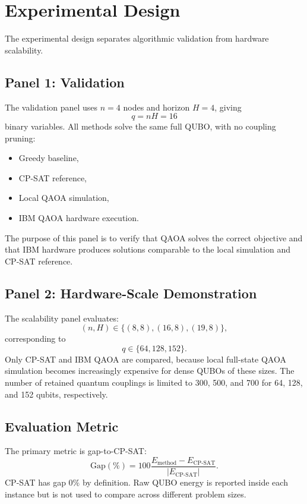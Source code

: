 \documentclass[runningheads]{llncs}
\begin{document}
\section{Experimental Design}

The experimental design separates algorithmic validation from hardware scalability.

\subsection{Panel 1: Validation}

The validation panel uses $n=4$ nodes and horizon $H=4$, giving
\begin{equation}
q=nH=16
\end{equation}
binary variables. All methods solve the same full QUBO, with no coupling pruning:
\begin{itemize}
    \item Greedy baseline,
    \item CP-SAT reference,
    \item Local QAOA simulation,
    \item IBM QAOA hardware execution.
\end{itemize}
The purpose of this panel is to verify that QAOA solves the correct objective and that IBM hardware produces solutions comparable to the local simulation and CP-SAT reference.

\subsection{Panel 2: Hardware-Scale Demonstration}

The scalability panel evaluates:
\begin{equation}
(n,H)\in\{(8,8),(16,8),(19,8)\},
\end{equation}
corresponding to
\begin{equation}
q\in\{64,128,152\}.
\end{equation}
Only CP-SAT and IBM QAOA are compared, because local full-state QAOA simulation becomes increasingly expensive for dense QUBOs of these sizes. The number of retained quantum couplings is limited to 300, 500, and 700 for 64, 128, and 152 qubits, respectively.

\subsection{Evaluation Metric}

The primary metric is gap-to-CP-SAT:
\begin{equation}
\mathrm{Gap}(\%)=
100
\frac{E_{\mathrm{method}}-E_{\mathrm{CP\text{-}SAT}}}
{|E_{\mathrm{CP\text{-}SAT}}|}.
\label{eq:gap}
\end{equation}
CP-SAT has gap $0\%$ by definition. Raw QUBO energy is reported inside each instance but is not used to compare across different problem sizes.
\end{document}
